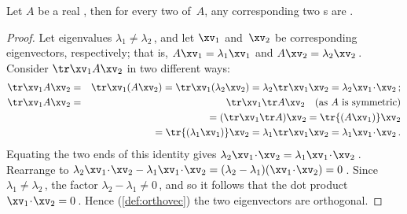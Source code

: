 \begin{theorem} \label{thm:orthoevec} 
Let \(A\) be a real , then for every two  of~\(A\), any corresponding two s are .
\end{theorem}
\begin{proof} 
Let eigenvalues \(\lambda_1\neq\lambda_2\)\,, and let \(\xv_1\) and~\(\xv_2\) be corresponding eigenvectors, respectively; that is, \(A\xv_1=\lambda_1\xv_1\) and \(A\xv_2=\lambda_2\xv_2\)\,.
Consider \(\tr\xv_1A\xv_2\) in two different ways:
\begin{eqnarray*}
\tr\xv_1A\xv_2
&=&\tr\xv_1(A\xv_2)
=\tr\xv_1(\lambda_2\xv_2)
=\lambda_2\tr\xv_1\xv_2
=\lambda_2\xv_1\cdot\xv_2\,;
\\\tr\xv_1A\xv_2&=&\tr\xv_1\tr A\xv_2\quad\text{(as \(A\) is symmetric)}
\\&&{}=(\tr\xv_1\tr A)\xv_2
=\tr{(A\xv_1)}\xv_2
\\&&{}=\tr{(\lambda_1\xv_1)}\xv_2
=\lambda_1\tr\xv_1\xv_2
=\lambda_1\xv_1\cdot\xv_2\,.
\end{eqnarray*}
Equating the two ends of this identity gives \(\lambda_2\xv_1\cdot\xv_2=\lambda_1\xv_1\cdot\xv_2\)\,.
Rearrange to \(\lambda_2\xv_1\cdot\xv_2-\lambda_1\xv_1\cdot\xv_2
=(\lambda_2-\lambda_1)(\xv_1\cdot\xv_2)=0\)\,.
Since \(\lambda_1\neq\lambda_2\)\,, the factor \(\lambda_2-\lambda_1\neq0\)\,, and so it follows that the dot product \(\xv_1\cdot\xv_2=0\)\,.
Hence (\autoref{def:orthovec}) the two eigenvectors are orthogonal.
\end{proof}



